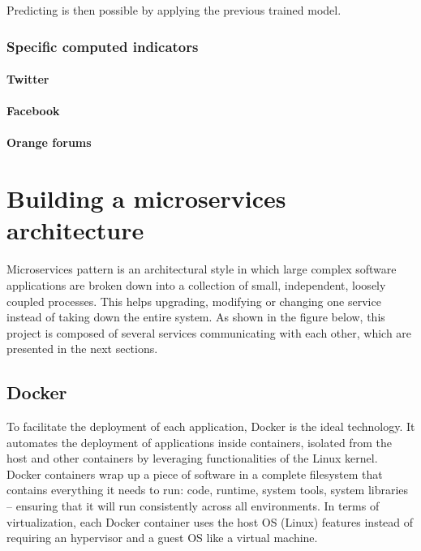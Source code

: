 \documentclass[11pt]{article}
\begin{document}
Predicting is then possible by applying the previous trained model.

\subsubsection{Specific computed indicators}

\paragraph{Twitter}


\paragraph{Facebook}

\paragraph{Orange forums}


\section{Building a microservices architecture}


Microservices pattern is an architectural style in which large complex software applications are broken down into a collection of small, independent, loosely coupled processes. This helps upgrading, modifying or changing one service instead of taking down the entire system. As shown in the figure below, this project is composed of several services communicating with each other, which are presented in the next sections.

\subsection{Docker}

To facilitate the deployment of each application, Docker is the ideal technology. It automates the deployment of applications inside containers, isolated from the host and other containers by leveraging functionalities of the Linux kernel. Docker containers wrap up a piece of software in a complete filesystem that contains everything it needs to run: code, runtime, system tools, system libraries – ensuring that it will run consistently across all environments. In terms of virtualization, each Docker container uses the host OS (Linux) features instead of requiring an hypervisor and a guest OS like a virtual machine.
\end{document}
